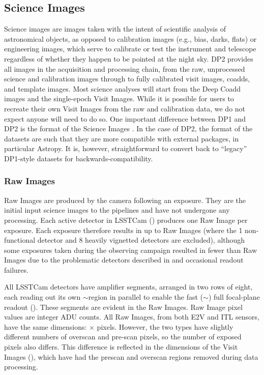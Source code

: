 \subsection{Science Images}
\label{ssec:scienceimages}
Science images are images taken with the intent of scientific analysis of astronomical objects, as opposed to \gls{calibration} images (e.g., bias, darks, flats) or engineering images, which serve to calibrate or test the instrument and telescope regardless of whether they happen to be pointed at the night sky.
\gls{DP2} provides all images in the acquisition and processing chain, from the raw, unprocessed science and calibration images through to fully calibrated visit images, coadds, and template images.
Most science analyses will start from the Deep Coadd images and the single-epoch \glspl{Visit Image}.
While it is possible for users to recreate their own \glspl{Visit Image} from the raw and calibration data, we do not expect anyone will need to do so.
One important difference between DP1 and DP2 is the format of the Science Images \citep[][]{DMTN-339}.
In the case of \gls{DP2}, the format of the datasets are such that they are more compatible with external packages, in particular Astropy.
It is, however, straightforward to convert back to ``legacy'' \gls{DP1}-style datasets for backwards-compatibility.

\subsubsection{Raw Images}
\label{sssec:rawimages}
Raw Images are produced by the \gls{camera} following an exposure.
They are the initial input science images to the pipelines and have not undergone any processing.
Each active detector in \gls{LSSTCam} () produces one Raw Image per exposure.
Each exposure therefore results in up to \nactivedetectors Raw Images (where the 1 non-functional detector and 8 heavily vignetted detectors are excluded), although some exposures taken during the observing campaign resulted in fewer than \nactivedetectors Raw Images due to the problematic detectors described in  and occasional readout failures.

All \gls{LSSTCam} detectors have \namps amplifier segments, arranged in two rows of eight, each reading out its own $\sim$\namppix region in parallel to enable the fast ($\sim$\tread) full focal-plane readout ().
These segments are evident in the Raw Images.
Raw Image pixel values are integer \gls{ADU} counts.
All Raw Images, from both \gls{E2V} and \gls{ITL} sensors, have the same dimensions: \nrawpixx $\times$ \nrawpixy pixels.
However, the two types have slightly different numbers of overscan and pre-scan pixels, so the number of exposed pixels also differs.
This difference is reflected in the dimensions of the \glspl{Visit Image} (), which have had the prescan and overscan regions removed during data processing.

